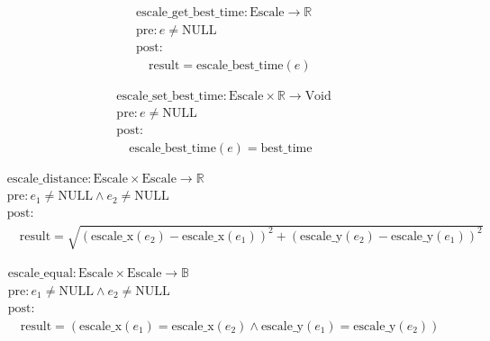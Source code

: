 \[
\begin{aligned}
&\text{escale\_get\_best\_time}: \text{Escale} \to \mathbb{R} \\
&\text{pre}: e \neq \text{NULL} \\
&\text{post}: \\
&\quad \text{result} = \text{escale\_best\_time}(e)
\end{aligned}
\]





\[
\begin{aligned}
&\text{escale\_set\_best\_time}: \text{Escale} \times \mathbb{R} \to \text{Void} \\
&\text{pre}: e \neq \text{NULL} \\
&\text{post}: \\
&\quad \text{escale\_best\_time}(e) = \text{best\_time}
\end{aligned}
\]





\[
\begin{aligned}
&\text{escale\_distance}: \text{Escale} \times \text{Escale} \to \mathbb{R} \\
&\text{pre}: e_1 \neq \text{NULL} \land e_2 \neq \text{NULL} \\
&\text{post}: \\
&\quad \text{result} = \sqrt{(\text{escale\_x}(e_2) - \text{escale\_x}(e_1))^2 + (\text{escale\_y}(e_2) - \text{escale\_y}(e_1))^2}
\end{aligned}
\]





\[
\begin{aligned}
&\text{escale\_equal}: \text{Escale} \times \text{Escale} \to \mathbb{B} \\
&\text{pre}: e_1 \neq \text{NULL} \land e_2 \neq \text{NULL} \\
&\text{post}: \\
&\quad \text{result} = (\text{escale\_x}(e_1) = \text{escale\_x}(e_2) \land \text{escale\_y}(e_1) = \text{escale\_y}(e_2))
\end{aligned}
\]